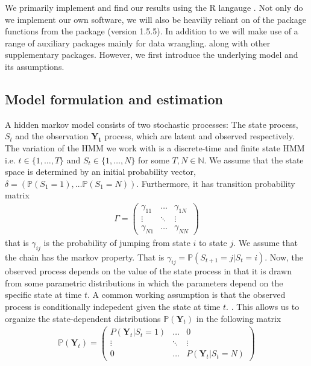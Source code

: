 We primarily implement and find our results using the R langauge \cite{RLang}.
Not only do we implement our own software, we will also be heaviliy reliant on of the package functions from the package  \cite{momentuHMM} (version 1.5.5). In addition to  we will make use of a range of auxiliary packages mainly for data wrangling.\cite{tidyverse}\cite{Rcpp} along with other supplementary packages.\cite{gridExtra}\cite{microbenchmark}\cite{ggthemes}\cite{ggmap}\cite{mapview} However, we first introduce the underlying model and its assumptions.
\subsection{Model formulation and estimation}
A hidden markov model consists of two stochastic processes: The state process, $S_t$ and the observation $\mathbf{Y_t}$ process, which are latent and observed respectively. The variation of the HMM we work with is a discrete-time and finite state HMM i.e. $t\in\{1,\dots , T\}$ and $S_t\in\{1,\dots , N\}$ for some $T, N\in\mathbb{N}$. We assume that the state space is determined by an initial probability vector, $\delta = \left(\mathbb{P}(S_1 = 1),\dots \mathbb{P}(S_1 = N)\right)$. Furthermore, it has transition probability matrix
\begin{align}
    \Gamma = \begin{pmatrix}
        \gamma_{11} & \dots &  \gamma_{1N} \\
        \vdots & \ddots & \vdots \\
        \gamma_{N1} & \dots & \gamma_{NN}
    \end{pmatrix} \label{Gamma1}
\end{align}
that is $\gamma_{ij}$ is the probability of jumping from state $i$ to state $j$. We assume that the chain has the markov property. That is $\gamma_{ij} = \mathbb{P}\left(S_{t+1} = j | S_t = i\right)$. Now, the observed process depends on the value of the state process in that it is drawn from some parametric distributions in which the parameters depend on the specific state at time $t$.
A common working assumption is that the observed process is conditionally indepedent given the state at time $t$. 
\cite{UncoveringEcologicalState}. This allows us to organize the state-dependent distributions $\mathbb{P}(\mathbf{Y}_t)$ in the following matrix
\begin{align}
    \mathbb{P}(\mathbf{Y}_t) = \begin{pmatrix}
        P(\mathbf{Y}_t | S_t = 1) & \dots &  0 \\
        \vdots & \ddots & \vdots \\
        0 & \dots & P(\mathbf{Y}_t | S_t = N)
    \end{pmatrix}  
\end{align}
